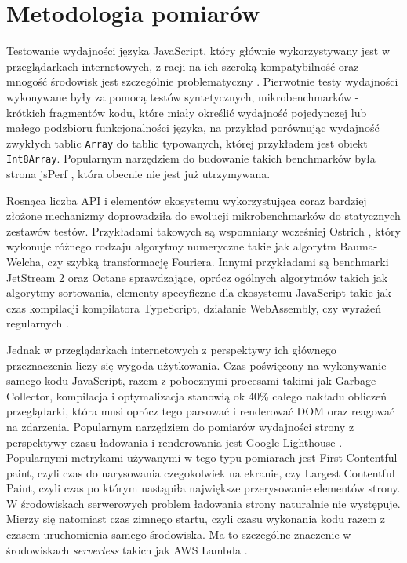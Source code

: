 \chapter{Metodologia pomiarów}

Testowanie wydajności języka JavaScript, który głównie wykorzystywany jest w przeglądarkach internetowych, z racji na ich szeroką kompatybilność oraz mnogość środowisk jest szczególnie problematyczny \cite{v8-real-perf}. Pierwotnie testy wydajności wykonywane były za pomocą testów syntetycznych, mikrobenchmarków - krótkich fragmentów kodu, które miały określić wydajność pojedynczej lub małego podzbioru funkcjonalności języka, na przykład porównując wydajność zwykłych tablic \mbox{\lstinline{Array}} do tablic typowanych, której przykładem jest obiekt \lstinline{Int8Array}. Popularnym narzędziem do budowanie takich benchmarków była strona jsPerf \cite{jsperf}, która obecnie nie jest już utrzymywana.

Rosnąca liczba API i elementów ekosystemu wykorzystująca coraz bardziej złożone mechanizmy doprowadziła do ewolucji mikrobenchmarków do statycznych zestawów testów. Przykładami takowych są wspomniany wcześniej Ostrich \cite{ostrich}, który wykonuje różnego rodzaju algorytmy numeryczne takie jak algorytm Bauma-Welcha, czy szybką transformację Fouriera. Innymi przykładami są benchmarki JetStream 2 oraz Octane sprawdzające, oprócz ogólnych algorytmów takich jak algorytmy sortowania, elementy specyficzne dla ekosystemu JavaScript takie jak czas kompilacji kompilatora TypeScript, działanie WebAssembly, czy wyrażeń regularnych \cite{octane, jetstream}.

Jednak w przeglądarkach internetowych z perspektywy ich głównego przeznaczenia liczy się wygoda użytkowania. Czas poświęcony na wykonywanie samego kodu JavaScript, razem z pobocznymi procesami takimi jak Garbage Collector, kompilacja i optymalizacja stanowią ok 40\% całego nakładu obliczeń przeglądarki, która musi oprócz tego parsować i renderować DOM oraz reagować na zdarzenia. Popularnym narzędziem do pomiarów wydajności strony z perspektywy czasu ładowania i renderowania jest Google Lighthouse \cite{lighthouse}. Popularnymi metrykami używanymi w tego typu pomiarach jest First Contentful paint, czyli czas do narysowania czegokolwiek na ekranie, czy Largest Contentful Paint, czyli czas po którym nastąpiła największe przerysowanie elementów strony. W środowiskach serwerowych problem ładowania strony naturalnie nie występuje. Mierzy się natomiast czas zimnego startu, czyli czasu wykonania kodu razem z czasem uruchomienia samego środowiska. Ma to szczególne znaczenie w środowiskach \textit{serverless} takich jak AWS Lambda \cite{aws-lambda}.


